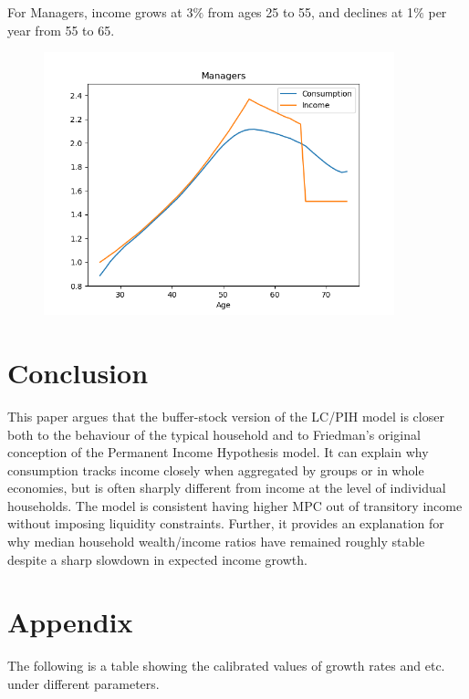 \documentclass[]{article}
\providecommand{\RefDir}{References}
\begin{document}
For Managers, income grows at 3$\%$ from ages 25 to 55, and declines at 1$\%$ per year from 55 to 65.\\
\begin{figure}[H] 
\centerline{\includegraphics[width=4in]{Figures/Figure5c.png}}
\end{figure}

\section{Conclusion}

This paper argues that the buffer-stock version of the LC/PIH model is closer both to the behaviour of the typical household and to Friedman's original conception of the Permanent Income Hypothesis model. It can explain why consumption tracks income closely when aggregated by groups or in whole economies, but is often sharply different from income at the level of individual households. The model is consistent having higher MPC out of transitory income without imposing liquidity constraints. Further, it provides an explanation for why median household wealth/income ratios have remained roughly stable despite a sharp slowdown in expected income growth.



\newpage

\section{Appendix}
The following is a table showing the calibrated values of growth rates and etc. under different parameters.
\begin{table}[H]
	\label{table:1}
	\centerline{\scalebox{.7}{}}
\end{table}

\newpage

\nocite{*}


\end{document}
